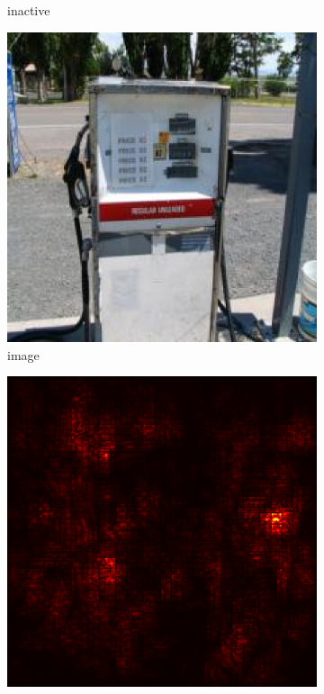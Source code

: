 \documentclass[preprint,12pt]{elsarticle}
\begin{document}
\begin{figure}
\begin{subfigure}{0.14\textwidth}
        \caption{inactive}
    \end{subfigure}
    \hfill
    \begin{subfigure}{0.14\linewidth}
        \centering
        \includegraphics[width=\linewidth]{../visualizations/examples/imagenette/cnn/images/9.png}
        \caption{image}
    \end{subfigure}
    \hfill
    \begin{subfigure}{0.14\linewidth}
        \centering
        \includegraphics[width=\linewidth]{../visualizations/examples/imagenette/cnn/saliency_map/9.png}

\end{subfigure}
\end{figure}
\end{document}
